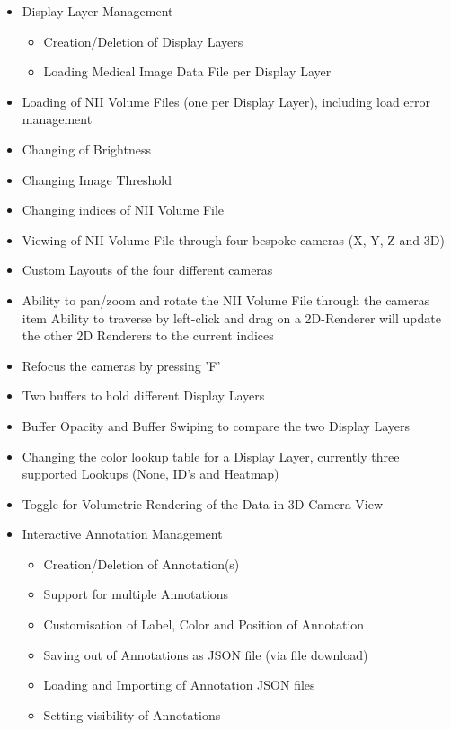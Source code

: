 \documentclass[a4paper,11pt,twoside]{article}
\begin{document}
\begin{itemize}
\item Display Layer Management

  \begin{itemize}
  \item Creation/Deletion of Display Layers
  \item Loading Medical Image Data File per Display Layer
  \end{itemize}

\item Loading of NII Volume Files (one per Display Layer), including load error management	
\item Changing of Brightness
\item Changing Image Threshold
\item Changing indices of NII Volume File
\item Viewing of NII Volume File through four bespoke cameras (X, Y, Z and 3D)
\item Custom Layouts of the four different cameras
\item Ability to pan/zoom and rotate the NII Volume File through the cameras
  item Ability to traverse by left-click and drag on a 2D-Renderer will update the other 2D Renderers to the current indices
\item Refocus the cameras by pressing 'F'
\item Two buffers to hold different Display Layers
\item Buffer Opacity and Buffer Swiping to compare the two Display Layers
\item Changing the color lookup table for a Display Layer, currently three supported Lookups (None, ID's and Heatmap)
\item Toggle for Volumetric Rendering of the Data in 3D Camera View
\item Interactive Annotation Management

  \begin{itemize}
  \item Creation/Deletion of Annotation(s)
  \item Support for multiple Annotations
  \item Customisation of Label, Color and Position of Annotation
  \item Saving out of Annotations as JSON file (via file download)
  \item Loading and Importing of Annotation JSON files
  \item Setting visibility of Annotations
  \end{itemize}


\end{itemize}
\end{document}
